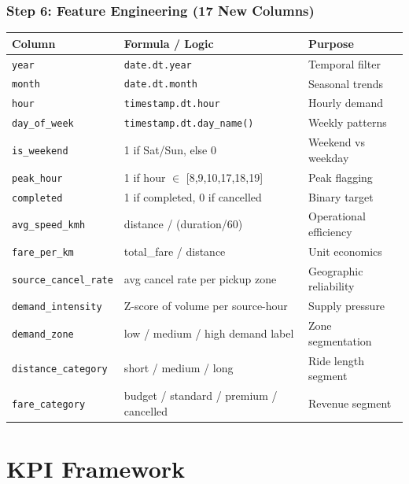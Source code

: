 \documentclass[12pt,a4paper]{article}
\begin{document}
\subsubsection{Step 6: Feature Engineering (17 New Columns)}
\begin{center}
\begin{tabular}{lll}
\toprule
\textbf{Column} & \textbf{Formula / Logic} & \textbf{Purpose} \\
\midrule
\texttt{year} & \texttt{date.dt.year} & Temporal filter \\
\texttt{month} & \texttt{date.dt.month} & Seasonal trends \\
\texttt{hour} & \texttt{timestamp.dt.hour} & Hourly demand \\
\texttt{day\_of\_week} & \texttt{timestamp.dt.day\_name()} & Weekly patterns \\
\texttt{is\_weekend} & 1 if Sat/Sun, else 0 & Weekend vs weekday \\
\texttt{peak\_hour} & 1 if hour $\in$ [8,9,10,17,18,19] & Peak flagging \\
\texttt{completed} & 1 if completed, 0 if cancelled & Binary target \\
\texttt{avg\_speed\_kmh} & distance / (duration/60) & Operational efficiency \\
\texttt{fare\_per\_km} & total\_fare / distance & Unit economics \\
\texttt{source\_cancel\_rate} & avg cancel rate per pickup zone & Geographic reliability \\
\texttt{demand\_intensity} & Z-score of volume per source-hour & Supply pressure \\
\texttt{demand\_zone} & low / medium / high demand label & Zone segmentation \\
\texttt{distance\_category} & short / medium / long & Ride length segment \\
\texttt{fare\_category} & budget / standard / premium / cancelled & Revenue segment \\
\bottomrule
\end{tabular}
\end{center}

\section{KPI Framework}
\end{document}
